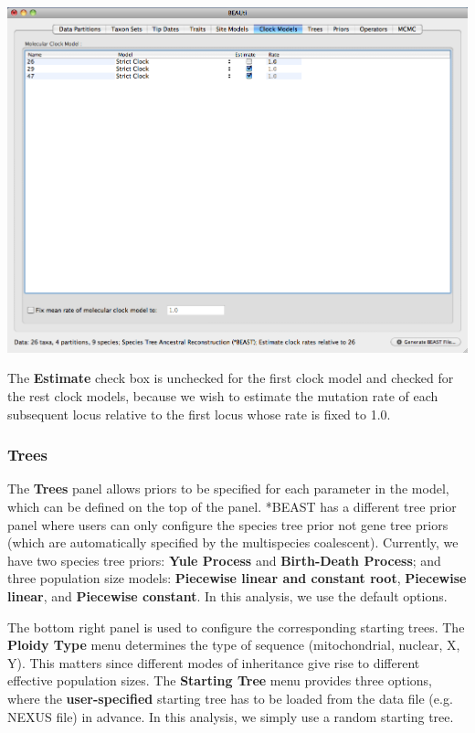 \documentclass[12pt]{article}
\begin{document}
\medskip{}

\includegraphics[scale=0.4]{figures/BEAUti_Clock}

\medskip{}

The \textbf{Estimate} check box is unchecked for the first clock model and checked for the rest clock models, because we wish to estimate the mutation rate of each subsequent locus relative to the first locus whose rate is fixed to 1.0. 

\subsubsection*{Trees}

The {\bf Trees} panel allows priors to be specified for each parameter in the model, which can be defined on the top of the panel. *BEAST has a different tree prior panel where users can only configure the species tree prior not gene tree priors (which are automatically specified by the multispecies coalescent). Currently, we have two species tree priors: \textbf{Yule Process} and \textbf{Birth-Death Process}; and three population size models: \textbf{Piecewise linear and constant root}, \textbf{Piecewise linear}, and \textbf{Piecewise constant}. In this analysis, we use the default options.

The bottom right panel is used to configure the corresponding starting trees. The \textbf{Ploidy Type} menu determines the type of sequence (mitochondrial, nuclear, X, Y). This matters since different modes of inheritance give rise to different effective population sizes. The \textbf{Starting Tree} menu provides three options, where the \textbf{user-specified} starting tree has to be loaded from the data file (e.g. NEXUS file) in advance. In this analysis, we simply use a random starting tree. 
\end{document}
